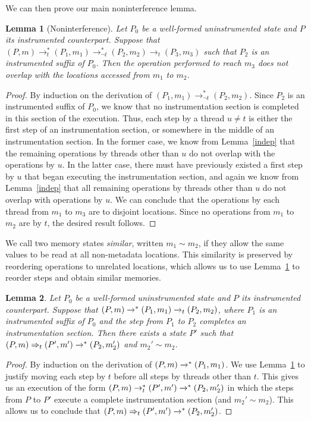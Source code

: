 \documentclass[preprint, 9pt]{sigplanconf}
\newcommand{\cfg}[2]{\ensuremath{(#1, #2)}}
\newcommand{\execstar}[4]{\ensuremath{\cfg{#1}{#2} \tto{#3} #4}}
\newcommand{\iexec}[4]{\ensuremath{\cfg{#1}{#2} \Rightarrow_{#3} #4}}
\newcommand{\execstart}[4]{\ensuremath{\cfg{#1}{#2} \rightarrow^{*}_{#3} #4}}
\newcommand{\execstarm}[4]{\ensuremath{\cfg{#1}{#2} \rightarrow^{*}_{\neg #3} #4}}
\newcommand{\execs}[3]{\ensuremath{ \xrightarrow{#2}_{#1} #3}}
\newcommand{\execstars}[2]{\ensuremath{ \tto{#1} #2}}
\newcommand{\execstarms}[2]{\ensuremath{ \rightarrow^{*}_{\neg #1} #2}}
\newcommand{\tto}[1]{\mathrel{
  \vphantom{\xrightarrow{#1}}
  \smash{\xrightarrow{#1}}
  \vphantom{\to}^{*}}
}
\newtheorem{lemma}{Lemma}
\begin{document}
We can then prove our main noninterference lemma.
\begin{lemma}[Noninterference]\label{noninterference}Let $P_0$ be a well-formed uninstrumented state and $P$ its instrumented counterpart. Suppose that $\execstart{P}{m}{t}{(P_1, m_1)} \execstarms{t}{(P_2, m_2)} \execs{t}{}{(P_3, m_3)}$ such that $P_2$ is an instrumented suffix of $P_0$. Then the operation performed to reach $m_3$ does not overlap with the locations accessed from $m_1$ to $m_2$.\end{lemma}
\begin{proof}By induction on the derivation of $\execstarm{P_1}{m_1}{t}{(P_2, m_2)}$. Since $P_2$ is an instrumented suffix of $P_0$, we know that no instrumentation section is completed in this section of the execution. Thus, each step by a thread $u \neq t$ is either the first step of an instrumentation section, or somewhere in the middle of an instrumentation section. In the former case, we know from Lemma~\ref{indep} that the remaining operations by threads other than $u$ do not overlap with the operations by $u$. In the latter case, there must have previously existed a first step by $u$ that began executing the instrumentation section, and again we know from Lemma~\ref{indep} that all remaining operations by threads other than $u$ do not overlap with operations by $u$. We can conclude that the operations by each thread from $m_1$ to $m_3$ are to disjoint locations. Since no operations from $m_1$ to $m_2$ are by $t$, the desired result follows.\end{proof}

We call two memory states \emph{similar}, written $m_1 \sim m_2$, if they allow the same values to be read at all non-metadata locations. This similarity is preserved by reordering operations to unrelated locations, which allows us to use Lemma~\ref{noninterference} to reorder steps and obtain similar memories.
 \begin{lemma}\label{first-finished}Let $P_0$ be a well-formed uninstrumented state and $P$ its instrumented counterpart. Suppose that $\execstar{P}{m}{}{(P_1, m_1)} \execs{t}{}{(P_2, m_2)}$, where $P_1$ is an instrumented suffix of $P_0$ and the step from $P_1$ to $P_2$ completes an instrumentation section. Then there exists a state $P'$ such that $\iexec{P}{m}{t}{(P', m')} \execstars{}{(P_2, m_2')}$ and $m_2' \sim m_2$.\end{lemma}
 \begin{proof}By induction on the derivation of $\execstar{P}{m}{}{(P_1, m_1)}$. We use Lemma~\ref{noninterference} to justify moving each step by $t$ before all steps by threads other than $t$. This gives us an execution of the form $\execstart{P}{m}{t}{(P', m')} \execstars{}{(P_2, m_2')}$ in which the steps from $P$ to $P'$ execute a complete instrumentation section (and $m_2' \sim m_2$). This allows us to conclude that $\iexec{P}{m}{t}{(P', m')} \execstars{}{(P_2, m_2')}$.\end{proof}
\end{document}
